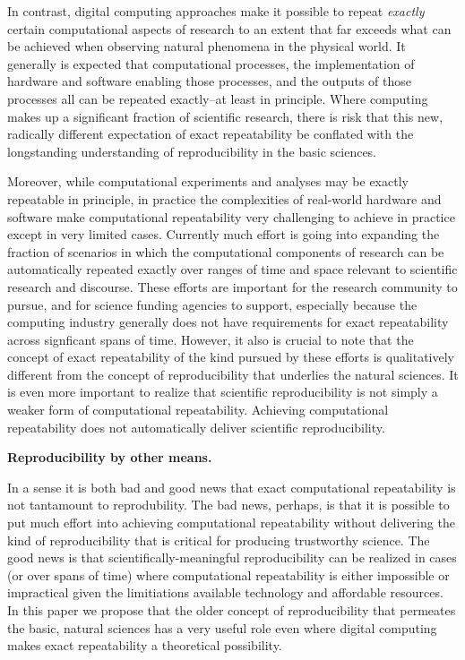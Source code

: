 In contrast, digital computing approaches make it possible to repeat \emph{exactly} certain computational aspects of research
	to an extent that far exceeds what can be achieved when observing natural phenomena in the physical world.  
It generally is expected that computational processes, the implementation of hardware and software 
	enabling those processes, and the outputs of those processes all can be repeated exactly--at least in principle.
Where computing makes up a significant fraction of scientific research, there is risk that this new, radically different 
	expectation of exact repeatability be conflated with the longstanding understanding of reproducibility in 
	the basic sciences. 

Moreover, while computational experiments and analyses may be exactly repeatable in principle, 
	in practice the complexities of real-world hardware and software make computational repeatability 
	very challenging to achieve in practice except in very limited cases.
Currently much effort is going into expanding the fraction of scenarios in which the computational
	components of research can be automatically repeated exactly over ranges of time and space relevant to scientific 
	research and discourse.
These efforts are important for the research community to pursue, and for science funding
	agencies to support, especially because the computing industry generally does not have 
	requirements for exact repeatability across signficant spans of time.
However, it also is crucial to note that the concept of exact repeatability of the kind pursued by these efforts is 
	qualitatively different from the concept of reproducibility that underlies the natural sciences.
It is even more important to realize that scientific reproducibility is not simply a weaker form of computational
	repeatability.  
Achieving computational repeatability does not automatically deliver scientific reproducibility.


\textbf{Reproducibility by other means.}

In a sense it is both bad and good news that exact computational repeatability is not tantamount to reprodubility.
The bad news, perhaps, is that it is possible to put much effort into achieving computational repeatability without delivering
	the kind of reproducibility that is critical for producing trustworthy science.
The good news is that scientifically-meaningful reproducibility can be realized in cases (or over spans of time)
	where computational repeatability is either impossible or impractical given the limitiations
	available technology and affordable resources.
In this paper we propose that the older concept of reproducibility that permeates the basic, natural sciences has a very
	useful role even where digital computing makes exact repeatability a theoretical possibility.

